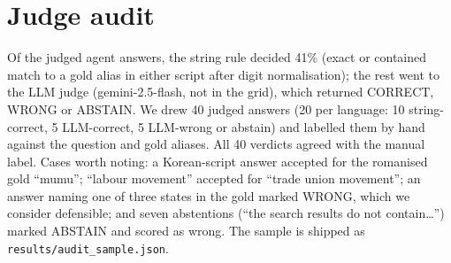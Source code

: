 \section{Judge audit}
\label{app:audit}
Of the judged agent answers, the string rule decided 41\% (exact or contained match to a gold alias in either script after digit normalisation); the rest went to the LLM judge (gemini-2.5-flash, not in the grid), which returned CORRECT, WRONG or ABSTAIN. We drew 40 judged answers (20 per language: 10 string-correct, 5 LLM-correct, 5 LLM-wrong or abstain) and labelled them by hand against the question and gold aliases. All 40 verdicts agreed with the manual label. Cases worth noting: a Korean-script answer accepted for the romanised gold ``mumu''; ``labour movement'' accepted for ``trade union movement''; an answer naming one of three states in the gold marked WRONG, which we consider defensible; and seven abstentions (``the search results do not contain\ldots'') marked ABSTAIN and scored as wrong. The sample is shipped as \texttt{results/audit\_sample.json}.
